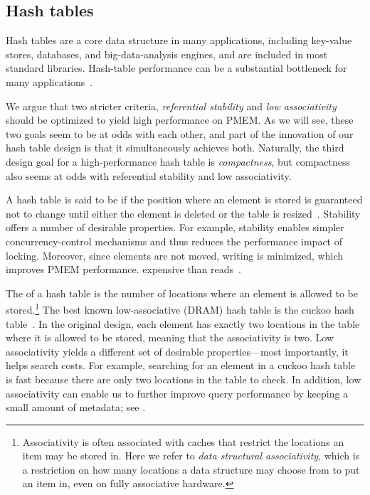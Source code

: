 \subsection{Hash tables}

Hash tables are a core data structure in many applications, including key-value
stores, databases, and big-data-analysis engines, and are included in most
standard libraries.  Hash-table performance can be a substantial bottleneck for
many applications~\cite{NealZu21,FanAn13,MetreveliZe12}.


We argue that two stricter criteria, \emph{referential stability} and \emph{low
associativity} should be optimized to yield high performance on PMEM.  As we
will see, these two goals seem to be at odds with each other, and part of the
innovation  of our hash table design is that it simultaneously achieves both.
Naturally, the third design goal for a high-performance hash table is
\emph{compactness}, but compactness also seems at odds with referential
stability and low associativity.

A hash table is said to be  if the position where an element is
stored is guaranteed not to change until either the element is deleted or the
table is resized~\cite{sandersstability,originalstability,KnuthVol3}.
Stability offers a number of desirable properties.  For example, stability
enables simpler concurrency-control mechanisms and thus reduces the performance
impact of locking.  Moreover, since elements are not moved, writing is
minimized, which improves PMEM performance.
expensive than reads~\cite{pmem-measurements}.

The  of a hash table is the number of locations where an
element is allowed to be stored.\footnote{Associativity is often associated with
caches that restrict the locations an item may be stored in.  Here we refer to
\emph{data structural associativity}, which is a restriction on how many
locations a data structure may choose from to put an item in, even on fully
associative hardware.} The best known low-associative (DRAM) hash table is the
cuckoo hash table~\cite{Pagh:CuckooHash,PaghRo01}.  In the original design, each
element has exactly two locations in the table where it is allowed to be stored,
meaning that the associativity is two.  Low associativity yields a different set
of desirable properties---most importantly, it helps search costs. For example,
searching for an element in a cuckoo hash table is fast because there are only
two locations in the table to check.  In addition, low associativity can enable
us to further improve query performance by keeping a small amount of metadata;
see .


